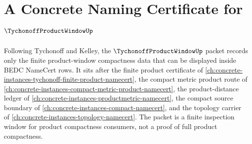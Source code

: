 \chapter{A Concrete Naming Certificate for $\TychonoffProductWindowUp$}
\label{ch:concrete-instances-tychonoff-product-window-namecert}

Following Tychonoff and Kelley, the $\TychonoffProductWindowUp$ packet records only the finite product-window compactness data that can be displayed inside BEDC NameCert rows. It sits after the finite product certificate of \autoref{ch:concrete-instances-tychonoff-finite-product-namecert}, the compact metric product route of \autoref{ch:concrete-instances-compact-metric-product-namecert}, the product-distance ledger of \autoref{ch:concrete-instances-productmetric-namecert}, the compact source boundary of \autoref{ch:concrete-instances-compact-namecert}, and the topology carrier of \autoref{ch:concrete-instances-topology-namecert}. The packet is a finite inspection window for product compactness consumers, not a proof of full product compactness.

